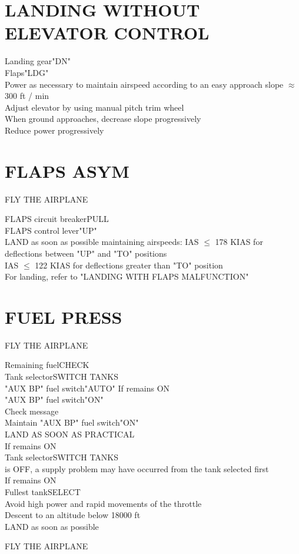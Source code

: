 \documentclass{article}
\newcommand{\fly}{\vspace{-1em}\begin{center}\color{Green}FLY THE AIRPLANE\end{center}\vspace{-1em}}
\newcommand{\warning}[1]{\colorbox{Black}{\color{Orange}{#1}}}
\newcommand{\caution}[1]{\colorbox{Black}{\color{Red}{#1}}}
\begin{document}
\begin{multicols*}{2}
\section*{LANDING WITHOUT ELEVATOR CONTROL}
Landing gear\dotfill "DN"\\
Flaps\dotfill "LDG"\\
Power as necessary to maintain airspeed according to an easy approach slope $\approx$300 ft / min\\
Adjust elevator by using manual pitch trim wheel\\
When ground approaches, decrease slope progressively\\
Reduce power progressively\\
\section*{\color{Red}FLAPS ASYM}
\vspace{1em}
\fly
FLAPS circuit breaker\dotfill PULL\\
FLAPS control lever\dotfill "UP"\\
LAND as soon as possible maintaining airspeeds:
\hspace*{6mm}IAS $\leq$ 178 KIAS for deflections between "UP" and "TO" positions\\
\hspace*{6mm}IAS $\leq$ 122 KIAS for deflections greater than "TO" position\\
For landing, refer to "LANDING WITH FLAPS MALFUNCTION"
\section*{\color{Red}FUEL PRESS}
\vspace{1em}
\fly
Remaining fuel\dotfill CHECK\\
Tank selector\dotfill SWITCH TANKS\\
"AUX BP" fuel switch\dotfill "AUTO"
If \warning{FUEL PRESS} remains ON\\
"AUX BP" fuel switch\dotfill "ON"\\
Check message \caution{AUX BOOST PMP ON}\\
Maintain "AUX BP" fuel switch\dotfill "ON"\\
{\color{Green}LAND AS SOON AS PRACTICAL}\\
If \warning{FUEL PRESS} remains ON\\
\hspace*{6mm} Tank selector\dotfill SWITCH TANKS\\
\warning{FUEL PRESS} is OFF, a supply problem may have occurred from the tank selected first\\
If \warning{FUEL PRESS} remains ON\\
\hspace*{6mm} Fullest tank\dotfill SELECT\\
Avoid high power and rapid movements of the throttle\\
Descent to an altitude below 18000 ft\\
LAND as soon as possible
\fly


\end{multicols*}
\end{document}
